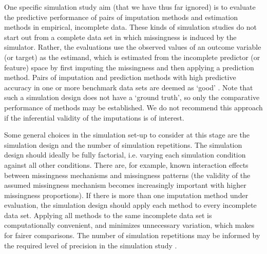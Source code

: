 \documentclass[bimj,fleqn]{w-art}
\begin{document}
One specific simulation study aim (that we have thus far ignored) is to evaluate the predictive performance of pairs of imputation methods and estimation methods in empirical, incomplete data. These kinds of simulation studies do not start out from a complete data set in which missingness is induced by the simulator. Rather, the evaluations use the observed values of an outcome variable (or target) as the estimand, which is estimated from the incomplete predictor (or feature) space by first imputing the missingness and then applying a prediction method. Pairs of imputation and prediction methods with high predictive accuracy in one or more benchmark data sets are deemed as `good' \citep{liu21}. Note that such a simulation design does not have a `ground truth', so only the comparative performance of methods may be established. We do not recommend this approach if the inferential validity of the imputations is of interest.


Some general choices in the simulation set-up to consider at this stage are the simulation design and the number of simulation repetitions. The simulation design should ideally be fully factorial, i.e. varying each simulation condition against all other conditions. There are, for example, known interaction effects between missingness mechanisms and missingness patterns (the validity of the assumed missingness mechanism becomes increasingly important with higher missingness proportions). If there is more than one imputation method under evaluation, the simulation design should apply each method to every incomplete data set. Applying all methods to the same incomplete data set is computationally convenient, and minimizes unnecessary variation, which makes for fairer comparisons. The number of simulation repetitions may be informed by the required level of precision in the simulation study \citep[e.g. as determined from a maximum tolerable level of uncertainty in terms of a performance measure's Monte Carlo error][]{morr18}. 


\end{document}
